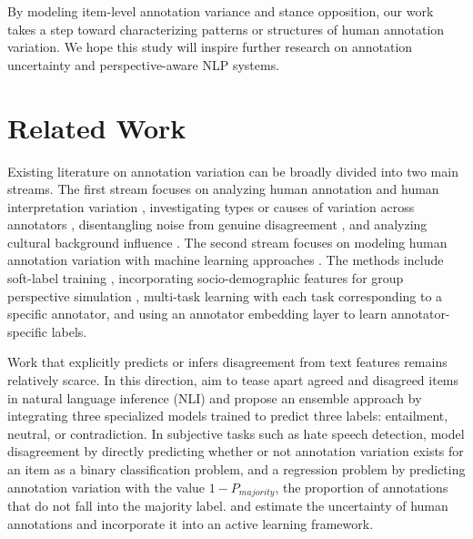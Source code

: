 \documentclass{article} %
\begin{document}
\noindent By modeling item-level annotation variance and stance opposition, our work takes a step toward characterizing patterns or structures of human annotation variation. We hope this study will inspire further research on annotation uncertainty and perspective-aware NLP systems.


\section{Related Work}

Existing literature on annotation variation can be broadly divided into two main streams. 
The first stream focuses on analyzing human annotation and human interpretation variation \citep{hong2025agree,jiang-marneffe-2022-investigating}, investigating types or causes of variation across annotators \citep{xu-etal-2023-dissonance}, disentangling noise from genuine disagreement \citep{weber-genzel-etal-2024-varierr}, and analyzing cultural background influence \citep{huang2023culturally}. 
The second stream focuses on modeling human annotation variation with machine learning approaches \citep{uma2021learning,davani-etal-2022-dealing,zhou-etal-2022-distributed}. The methods include soft-label training \citep{uma2021learning,fornaciari2021beyond}, incorporating socio-demographic features for group perspective simulation \citep{gordon2022jury}, multi-task learning \citep{davani-etal-2022-dealing} with each task corresponding to a specific annotator, and using an annotator embedding layer \citep{mokhberian-etal-2024-capturing} to learn annotator-specific labels.


\vspace{0.15cm}

Work that explicitly predicts or infers disagreement from text features remains relatively scarce. In this direction, \citet{zhang-de-marneffe-2021-identifying} aim to tease apart agreed and disagreed items in natural language inference (NLI) and propose an ensemble approach by integrating three specialized models trained to predict three labels: entailment, neutral, or contradiction. In subjective tasks such as hate speech detection, \citet{wan2023everyone} model disagreement by directly predicting whether or not annotation variation exists for an item as a binary classification problem, and a regression problem by predicting annotation variation with the value 
$1 - P_{{majority}}$, the proportion of annotations that do not fall into the majority label. \citet{baumler-etal-2023-examples} and \citet{van-der-meer-etal-2024-annotator} estimate the uncertainty of human annotations and incorporate it into an active learning framework.
\end{document}
